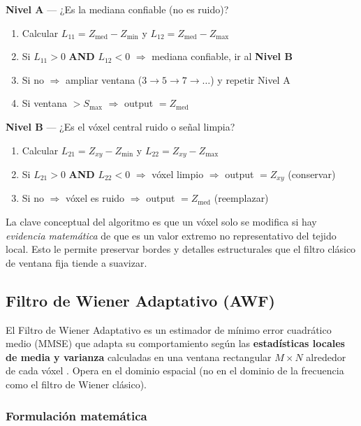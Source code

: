 \documentclass[12pt, a4paper]{article}
\begin{document}
\begin{tcolorbox}[codestyle, title={Algoritmo AMF — Dos niveles de decisión}]
\textbf{Nivel A} — ¿Es la mediana confiable (no es ruido)?
\begin{enumerate}
  \item Calcular $L_{11} = Z_{\text{med}} - Z_{\min}$ y $L_{12} = Z_{\text{med}} - Z_{\max}$
  \item Si $L_{11} > 0$ \textbf{AND} $L_{12} < 0$ $\Rightarrow$ mediana confiable, ir al \textbf{Nivel B}
  \item Si no $\Rightarrow$ ampliar ventana ($3 \to 5 \to 7 \to \ldots$) y repetir Nivel A
  \item Si ventana $> S_{\max}$ $\Rightarrow$ output $= Z_{\text{med}}$
\end{enumerate}
\textbf{Nivel B} — ¿Es el vóxel central ruido o señal limpia?
\begin{enumerate}
  \item Calcular $L_{21} = Z_{xy} - Z_{\min}$ y $L_{22} = Z_{xy} - Z_{\max}$
  \item Si $L_{21} > 0$ \textbf{AND} $L_{22} < 0$ $\Rightarrow$ vóxel limpio $\Rightarrow$ output $= Z_{xy}$ (conservar)
  \item Si no $\Rightarrow$ vóxel es ruido $\Rightarrow$ output $= Z_{\text{med}}$ (reemplazar)
\end{enumerate}
\end{tcolorbox}

La clave conceptual del algoritmo es que un vóxel solo se modifica si hay \textit{evidencia
matemática} de que es un valor extremo no representativo del tejido local. Esto le permite
preservar bordes y detalles estructurales que el filtro clásico de ventana fija tiende a
suavizar.

\subsection{Filtro de Wiener Adaptativo (AWF)}

El Filtro de Wiener Adaptativo es un estimador de mínimo error cuadrático medio (MMSE)
que adapta su comportamiento según las \textbf{estadísticas locales de media y varianza}
calculadas en una ventana rectangular $M \times N$ alrededor de cada vóxel
\cite{ali2018}. Opera en el dominio espacial (no en el dominio de la frecuencia como el
filtro de Wiener clásico).

\subsubsection{Formulación matemática}
\end{document}
